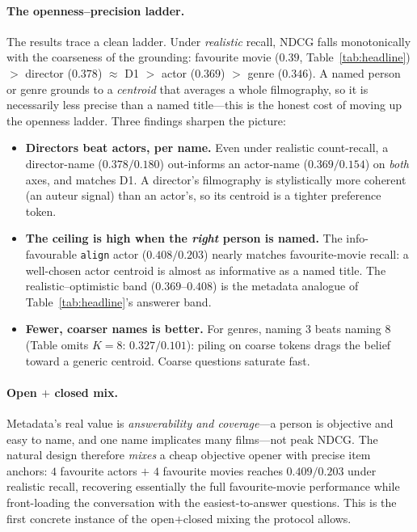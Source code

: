 \documentclass[11pt]{article}
\begin{document}
\paragraph{The openness--precision ladder.} The results trace a clean ladder. Under \emph{realistic} recall, NDCG falls
monotonically with the coarseness of the grounding: favourite movie ($0.39$, Table~\ref{tab:headline}) $>$ director
($0.378$) $\approx$ D1 $>$ actor ($0.369$) $>$ genre ($0.346$). A named person or genre grounds to a \emph{centroid}
that averages a whole filmography, so it is necessarily less precise than a named title---this is the honest cost of
moving up the openness ladder. Three findings sharpen the picture:
\begin{itemize}
  \item \textbf{Directors beat actors, per name.} Even under realistic count-recall, a director-name ($0.378/0.180$)
  out-informs an actor-name ($0.369/0.154$) on \emph{both} axes, and matches D1. A director's filmography is
  stylistically more coherent (an auteur signal) than an actor's, so its centroid is a tighter preference token.
  \item \textbf{The ceiling is high when the \emph{right} person is named.} The info-favourable
  \texttt{align} actor ($0.408/0.203$) nearly matches favourite-movie recall: a well-chosen actor centroid is almost as
  informative as a named title. The realistic--optimistic band ($0.369$--$0.408$) is the metadata analogue of
  Table~\ref{tab:headline}'s answerer band.
  \item \textbf{Fewer, coarser names is better.} For genres, naming $3$ beats naming $8$ (Table omits $K{=}8$:
  $0.327/0.101$): piling on coarse tokens drags the belief toward a generic centroid. Coarse questions saturate fast.
\end{itemize}

\paragraph{Open $+$ closed mix.} Metadata's real value is \emph{answerability and coverage}---a person is objective and
easy to name, and one name implicates many films---not peak NDCG. The natural design therefore \emph{mixes} a cheap
objective opener with precise item anchors: $4$ favourite actors $+$ $4$ favourite movies reaches $0.409/0.203$ under
realistic recall, recovering essentially the full favourite-movie performance while front-loading the conversation with
the easiest-to-answer questions. This is the first concrete instance of the open$+$closed mixing the protocol allows.
\end{document}
